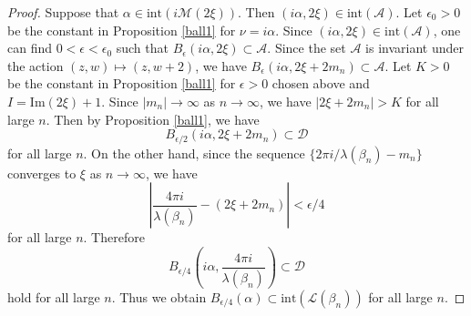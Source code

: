 \documentclass[12pt]{article}
\theoremstyle{plain}
\theoremstyle{definition}
\theoremstyle{remark}
\newcommand{\D}{\mathcal D}
\newcommand{\M}{\mathcal M}
\newcommand{\LL}{\mathcal L}
\newcommand{\A}{\mathcal A}
\newcommand{\lam}{\lambda}
\newcommand{\alp}{\alpha}
\newcommand{\fty}{\infty}
\newcommand{\ep}{\epsilon}
\newcommand{\inte}{\mathrm{int}}
\newcommand{\im}{\mathrm{Im}}
\begin{document}
\begin{proof} 
Suppose that $\alpha  \in \inte(i  \M({2\xi}))$. 
Then  $(i\alp,2\xi) \in \inte(\A)$. 
Let $\ep_0>0$ be the constant in Proposition \ref{ball1} for $\nu=i\alp$. 
Since $(i\alp,2\xi) \in \inte(\A)$, one can find $0<\ep<\ep_0$ such that 
$B_\ep(i \alpha, 2\xi) \subset \A$. 
Since the set $\A$ is invariant under the action $(z,w) \mapsto (z,w+2)$, 
we have $B_\ep(i \alpha, 2\xi+2m_n) \subset \A$. 
Let $K>0$ be the constant in Proposition \ref{ball1} 
for $\ep>0$ chosen above and $I=\im(2 \xi)+1$. 
Since $|m_n| \to \fty$ as $n \to \fty$,   
we have $|2\xi+2m_n|>K$ for all large $n$. 
Then by Proposition \ref{ball1},  we have  
$$
B_{\ep/2}(i \alpha, 2\xi+2m_n) \subset  \D
$$
for all large $n$. 
On the other hand, since  the sequence $\{2\pi i/\lam(\beta_n)-m_n\}$ 
converges to $\xi$ as $n \to \fty$, 
we have 
$$
\left|\frac{4\pi i}{\lam(\beta_n)} -(2\xi+2m_n)\right| < \ep/4
$$
for all large $n$. 
Therefore 
$$
B_{\ep/4}\left(i \alpha, \frac{4\pi i}{\lam(\beta_n)}\right) \subset  \D
$$
hold for all large $n$. 
Thus we obtain 
$B_{\ep/4}(\alp) \subset  \inte(\LL(\beta_n))$ for all large $n$. 
\end{proof}
\end{document}
